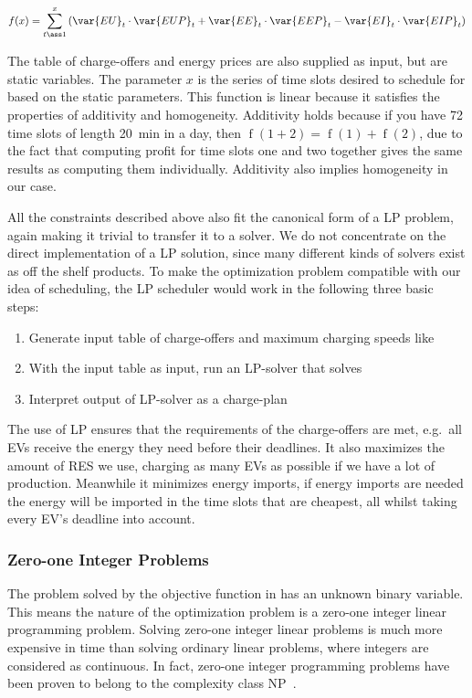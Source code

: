 \begin{equation}\label{eq:lpprob}
  \mathop{f}(x) = \sum_{t \ass 1}^x \left(\var{EU}_t \cdot \var{EUP}_t + \var{EE}_t \cdot \var{EEP}_t - \var{EI}_t \cdot \var{EIP}_t\right) 
\end{equation}

The table of charge-offers and energy prices are also supplied as input, but are static variables. The parameter $x$ is the series of time slots desired to schedule for based on the static parameters. This function is linear because it satisfies the properties of additivity and homogeneity. Additivity holds because if you have 72 time slots of length \SI{20}{\minute} in a day, then $\mathop{f}(1 + 2) = \mathop{f}(1) + \mathop{f}(2)$, due to the fact that computing profit for time slots one and two together gives the same results as computing them individually. Additivity also implies homogeneity in our case.

All the constraints described above also fit the canonical form of a LP problem, again making it trivial to transfer it to a solver.  We do not concentrate on the direct implementation of a LP solution, since many different kinds of solvers exist as off the shelf products. To make the optimization problem compatible with our idea of scheduling, the LP scheduler would work in the following three basic steps: 

\begin{enumerate}
  \item Generate input table of charge-offers and maximum charging speeds like 
  \item With the input table as input, run an LP-solver that solves 
  \item Interpret output of LP-solver as a charge-plan
\end{enumerate}

The use of LP ensures that the requirements of the charge-offers are met, e.g.\ all EVs receive the energy they need before their deadlines. It also maximizes the amount of RES we use, charging as many EVs as possible if we have a lot of production. Meanwhile it minimizes energy imports, if energy imports are needed the energy will be imported in the time slots that are cheapest, all whilst taking every EV's deadline into account.

\subsubsection{Zero-one Integer Problems}
The problem solved by the objective function in  has an unknown binary variable. This means the nature of the optimization problem is a zero-one integer linear programming problem. Solving zero-one integer linear problems is much more expensive in time than solving ordinary linear problems, where integers are considered as continuous. In fact, zero-one integer programming problems have been proven to belong to the complexity class NP~\cite{Karp72}.

